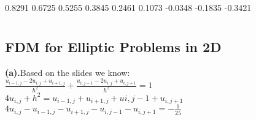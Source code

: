     0.8291
    0.6725
    0.5255
    0.3845
    0.2461
    0.1073
   -0.0348
   -0.1835
   -0.3421

\section*{}
\setcounter{section}{11}
\subsection{FDM for Elliptic Problems in 2D} 
\textbf{(a).}Based on the slides we know:\\
$\frac{u_{i-1,j}-2u_{i,j}+u_{i+1,j}}{h^2}+\frac{u_{i,j-1}-2u_{i,j}+u_{i,j+1}}{h^2}=1$
\\$4u_{i,j}+h^2=u_{i-1,j}+u_{i+1,j}+u{i,j-1}+u_{i,j+1}$\\
$4u_{i,j}-u_{i-1,j}-u_{i+1,j}-u_{i,j-1}-u_{i,j+1}=-\frac{1}{25}$
